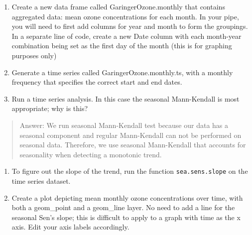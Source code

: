 \documentclass[
]{article}
\begin{document}
\begin{enumerate}
\def\labelenumi{\arabic{enumi}.}
\setcounter{enumi}{8}
\item
  Create a new data frame called GaringerOzone.monthly that contains
  aggregated data: mean ozone concentrations for each month. In your
  pipe, you will need to first add columns for year and month to form
  the groupings. In a separate line of code, create a new Date column
  with each month-year combination being set as the first day of the
  month (this is for graphing purposes only)
\item
  Generate a time series called GaringerOzone.monthly.ts, with a monthly
  frequency that specifies the correct start and end dates.
\item
  Run a time series analysis. In this case the seasonal Mann-Kendall is
  most appropriate; why is this?
\end{enumerate}

\begin{quote}
Answer: We run seasonal Mann-Kendall test because our data has a
seasonal component and regular Mann-Kendall can not be performed on
seasonal data. Therefore, we use seasonal Mann-Kendall that accounts for
seasonality when detecting a monotonic trend.
\end{quote}

\begin{enumerate}
\def\labelenumi{\arabic{enumi}.}
\setcounter{enumi}{11}
\item
  To figure out the slope of the trend, run the function
  \texttt{sea.sens.slope} on the time series dataset.
\item
  Create a plot depicting mean monthly ozone concentrations over time,
  with both a geom\_point and a geom\_line layer. No need to add a line
  for the seasonal Sen's slope; this is difficult to apply to a graph
  with time as the x axis. Edit your axis labels accordingly.
\end{enumerate}
\end{document}

